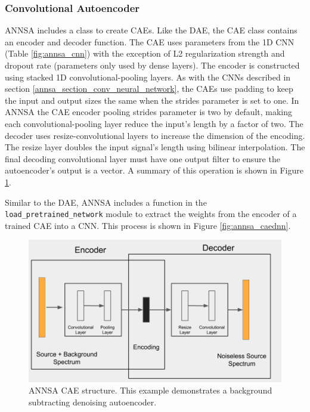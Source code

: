 \subsubsection{Convolutional Autoencoder}

ANNSA includes a class to create CAEs. Like the DAE, the CAE class contains an encoder and decoder function. The CAE uses parameters from the 1D CNN (Table \ref{fig:annsa_cnn}) with the exception of L2 regularization strength and dropout rate (parameters only used by dense layers). The encoder is constructed using stacked 1D convolutional-pooling layers. As with the CNNs described in section \ref{annsa_section_conv_neural_network}, the CAEs use padding to keep the input and output sizes the same when the strides parameter is set to one. In ANNSA the CAE encoder pooling strides parameter is two by default, making each convolutional-pooling layer reduce the input's length by a factor of two. The decoder uses resize-convolutional layers to increase the dimension of the encoding. The resize layer doubles the input signal's length using bilinear interpolation. The final decoding convolutional layer must have one output filter to ensure the autoencoder's output is a vector. A summary of this operation is shown in Figure \ref{fig:annsa_cae}.

Similar to the DAE, ANNSA includes a function in the \verb|load_pretrained_network| module to extract the weights from the encoder of a trained CAE into a CNN. This process is shown in Figure \ref{fig:annsa_caednn}.

\begin{figure}[H]
\centering
\includegraphics[trim=0 0 30 0,clip,width=1.0\linewidth]{images/annsa_cae.png}
\caption{ANNSA CAE structure. This example demonstrates a background subtracting denoising autoencoder.}
\label{fig:annsa_cae}
\end{figure}

